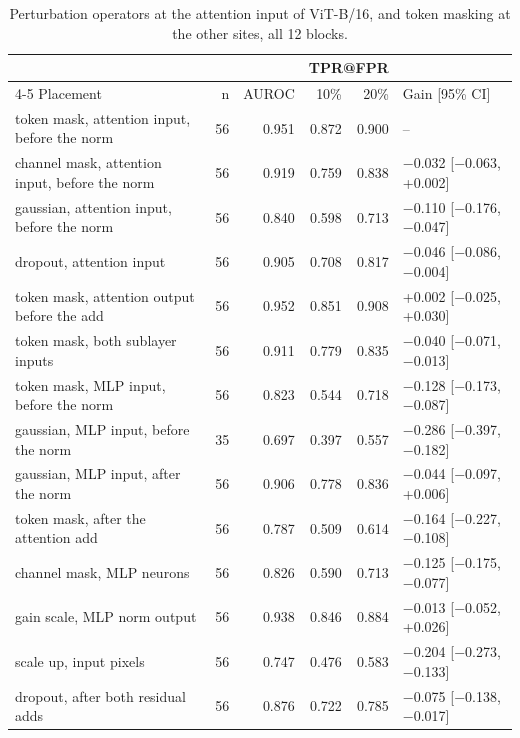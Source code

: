 \begin{table}[htbp]
\centering
\small
\caption{Perturbation operators at the attention input of ViT-B/16, and token masking at the other sites, all 12 blocks.}
\label{tab:staircase-operators}
\begin{tabular}{lrrrrl}
\toprule
 & & & \multicolumn{2}{c}{TPR@FPR} & \\
\cmidrule(lr){4-5}
Placement & n & AUROC & 10\% & 20\% & Gain [95\% CI] \\
\midrule
token mask, attention input, before the norm & 56 & 0.951 & 0.872 & 0.900 & -- \\
channel mask, attention input, before the norm & 56 & 0.919 & 0.759 & 0.838 & $-$0.032 [$-$0.063, +0.002] \\
gaussian, attention input, before the norm & 56 & 0.840 & 0.598 & 0.713 & $-$0.110 [$-$0.176, $-$0.047] \\
dropout, attention input & 56 & 0.905 & 0.708 & 0.817 & $-$0.046 [$-$0.086, $-$0.004] \\
token mask, attention output before the add & 56 & 0.952 & 0.851 & 0.908 & +0.002 [$-$0.025, +0.030] \\
token mask, both sublayer inputs & 56 & 0.911 & 0.779 & 0.835 & $-$0.040 [$-$0.071, $-$0.013] \\
token mask, MLP input, before the norm & 56 & 0.823 & 0.544 & 0.718 & $-$0.128 [$-$0.173, $-$0.087] \\
gaussian, MLP input, before the norm & 35 & 0.697 & 0.397 & 0.557 & $-$0.286 [$-$0.397, $-$0.182] \\
gaussian, MLP input, after the norm & 56 & 0.906 & 0.778 & 0.836 & $-$0.044 [$-$0.097, +0.006] \\
token mask, after the attention add & 56 & 0.787 & 0.509 & 0.614 & $-$0.164 [$-$0.227, $-$0.108] \\
channel mask, MLP neurons & 56 & 0.826 & 0.590 & 0.713 & $-$0.125 [$-$0.175, $-$0.077] \\
gain scale, MLP norm output & 56 & 0.938 & 0.846 & 0.884 & $-$0.013 [$-$0.052, +0.026] \\
scale up, input pixels & 56 & 0.747 & 0.476 & 0.583 & $-$0.204 [$-$0.273, $-$0.133] \\
dropout, after both residual adds & 56 & 0.876 & 0.722 & 0.785 & $-$0.075 [$-$0.138, $-$0.017] \\
\bottomrule
\end{tabular}
\end{table}
